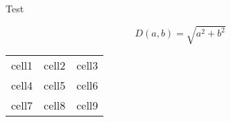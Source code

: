 \documentclass{article}
\begin{document}
Test

$$
    D(a, b) = \sqrt{a^2 + b^2}
$$

\begin{tabular}{ c c c }
    cell1 & cell2 & cell3 \\ 
    cell4 & cell5 & cell6 \\  
    cell7 & cell8 & cell9    
\end{tabular}
\end{document}
